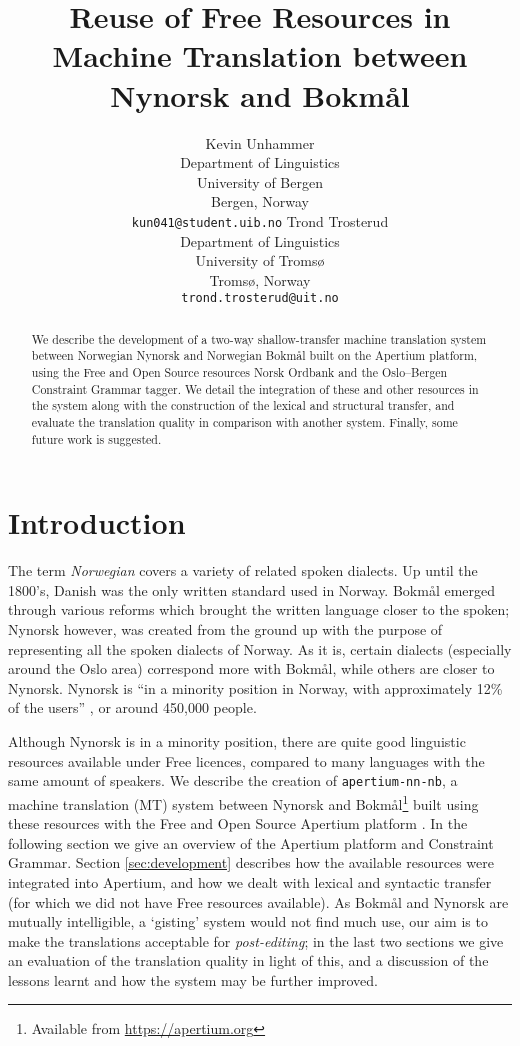 \documentclass[11pt]{article}
\author{Kevin Unhammer\\  Department of Linguistics \\ University of Bergen \\  Bergen, Norway \\  {\tt \small   kun041@student.uib.no} \And  Trond Trosterud \\  Department of Linguistics \\  University of Tromsø \\  Tromsø, Norway \\    {\tt \small  trond.trosterud@uit.no}}
\title{Reuse of Free Resources in Machine Translation between Nynorsk and Bokmål}
\begin{document}
\maketitle

  \begin{abstract}
    We describe the development of a two-way shallow-transfer machine
    translation system between Norwegian Nynorsk and Norwegian Bokmål
    built on the Apertium platform, using the Free and Open Source
    resources Norsk Ordbank and the Oslo–Bergen Constraint Grammar
    tagger. We detail the integration of these and other resources in
    the system along with the construction of the lexical and
    structural transfer, and evaluate the translation quality in
    comparison with another system. Finally, some future work is
    suggested.
  \end{abstract}

\section{Introduction}
The term \emph{Norwegian} covers a variety of related spoken dialects.
Up until the 1800's, Danish was the only written standard used in
Norway. Bokmål emerged through various reforms which brought the
written language closer to the spoken; Nynorsk however, was created
from the ground up with the purpose of representing all the spoken
dialects of Norway. As it is, certain dialects (especially around the
Oslo area) correspond more with Bokmål, while others are closer to
Nynorsk. Nynorsk is ``in a minority position in Norway, with
approximately 12\% of the users'' \citep{everson2000sln}, or around
450,000 people.

Although Nynorsk is in a minority position, there are quite good
linguistic resources available under Free licences, compared to many
languages with the same amount of speakers. We describe the creation
of {\tt \small apertium-nn-nb}, a machine translation (MT) system
between Nynorsk and Bokmål\footnote{Available from
  \href{https://apertium.org}{https://apertium.org} } built using these
resources with the Free and Open Source Apertium platform
\citep{armentano2006ops}. In the following section we give an overview
of the Apertium platform and Constraint Grammar. Section
\ref{sec:development} describes how the available resources were
integrated into Apertium, and how we dealt with lexical and syntactic
transfer (for which we did not have Free resources available). As
Bokmål and Nynorsk are mutually intelligible, a `gisting' system would
not find much use, our aim is to make the translations acceptable for
\emph{post-editing}; in the last two sections we give an evaluation of
the translation quality in light of this, and a discussion of the
lessons learnt and how the system may be further improved.
\end{document}
